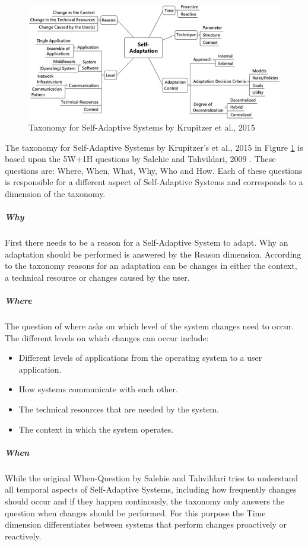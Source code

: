 \newpage
\begin{figure}[t!]
    \includegraphics[width=\textwidth]{images/KrupitzerTaxonomy.jpg}
    \caption{Taxonomy for Self-Adaptive Systems by Krupitzer et al., 2015 \cite*{SurveyOnEngineeringApproaches}}
    \label{fig:KrupitzerTaxonomy}
\end{figure}

The taxonomy for Self-Adaptive Systems by Krupitzer's et al., 2015 \cite*{SurveyOnEngineeringApproaches} in Figure \ref{fig:KrupitzerTaxonomy}
is based upon the 5W+1H questions by Salehie and Tahvildari, 2009 \cite*{LandscapeAndResearchChallenges}.
These questions are: Where, When, What, Why, Who and How.
Each of these questions is responsible for a different aspect of Self-Adaptive Systems and corresponds to a dimension of the taxonomy.

\subparagraph*{Why}
First there needs to be a reason for a Self-Adaptive System to adapt. Why an adaptation should be performed is answered by the Reason dimension.
According to the taxonomy reasons for an adaptation can be changes in either the context, a technical resource or changes caused by the user.

\subparagraph*{Where}
The question of where asks on which level of the system changes need to occur.
The different levels on which changes can occur include:
\begin{itemize}
    \item Different levels of applications from the operating system to a user application.
    \item How systems communicate with each other.
    \item The technical resources that are needed by the system.
    \item The context in which the system operates.
\end{itemize}

\subparagraph*{When}
While the original When-Question by Salehie and Tahvildari tries to understand all temporal aspects of Self-Adaptive Systems,
including how frequently changes should occur and if they happen continously,
the taxonomy only answers the question when changes should be performed.
For this purpose the Time dimension differentiates between systems that perform changes proactively or reactively.

